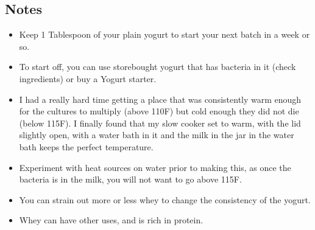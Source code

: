 \begin{multicols}{2}
\subsection*{Notes}
\begin{itemize}
    \item Keep 1 Tablespoon of your plain yogurt to start your next batch in a week or so.
    \item To start off, you can use storebought yogurt that has bacteria in it (check ingredients) or buy a Yogurt starter.
    \item I had a really hard time getting a place that was consistently warm enough for the cultures to multiply (above 110F) but cold enough they did not die (below 115F). I finally found that my slow cooker set to warm, with the lid slightly open, with a water bath in it and the milk in the jar in the water bath keeps the perfect temperature.
    \item Experiment with heat sources on water prior to making this, as once the bacteria is in the milk, you will not want to go above 115F.
    \item You can strain out more or less whey to change the consistency of the yogurt.
    \item Whey can have other uses, and is rich in protein.
\end{itemize}
\end{multicols}
\clearpage